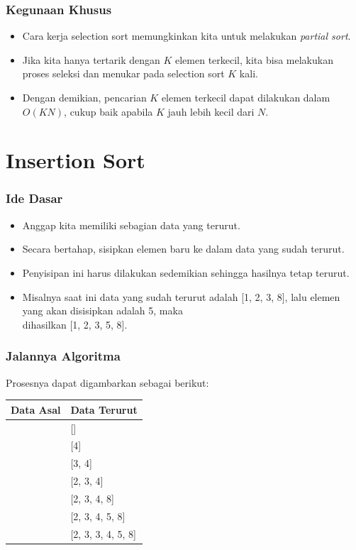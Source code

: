 \begin{frame}
\frametitle{Kegunaan Khusus}
  \begin{itemize}
    \item Cara kerja selection sort memungkinkan kita untuk melakukan
    \textit{partial sort}.
    \item Jika kita hanya tertarik dengan $K$ elemen terkecil, kita bisa
    melakukan proses seleksi dan menukar pada selection sort $K$
    kali.
    \item Dengan demikian, pencarian $K$ elemen terkecil dapat
    dilakukan dalam $O(KN)$, cukup baik apabila $K$ jauh lebih
    kecil dari $N$.
  \end{itemize}
\end{frame}

\section{Insertion Sort}
\frame{\sectionpage}

\begin{frame}
\frametitle{Ide Dasar}
  \begin{itemize}
    \item Anggap kita memiliki sebagian data yang terurut.
    \item Secara bertahap, sisipkan elemen baru ke dalam data yang sudah terurut.
    \item Penyisipan ini harus dilakukan sedemikian sehingga hasilnya tetap terurut.
    \item Misalnya saat ini data yang sudah terurut adalah [1, 2, 3, 8], lalu elemen yang akan disisipkan adalah 5, maka \\
    dihasilkan [1, 2, 3, 5, 8].
  \end{itemize}
\end{frame}

\begin{frame}
\frametitle{Jalannya Algoritma}
  Prosesnya dapat digambarkan sebagai berikut:
  \begin{table}[ht]
    \begin{tabular}{|l|l|}
      \hline Data Asal  & Data Terurut \\
      \hline [4, 3, 2, 8, 5, 3] & [] \\
      \hline [3, 2, 8, 5, 3] & [4] \\
      \hline [2, 8, 5, 3] & [3, 4] \\
      \hline [8, 5, 3] & [2, 3, 4] \\
      \hline [5, 3] & [2, 3, 4, 8] \\
      \hline [3] & [2, 3, 4, 5, 8] \\
      \hline [] & [2, 3, 3, 4, 5, 8] \\
      \hline
    \end{tabular}
  \end{table}
\end{frame}

